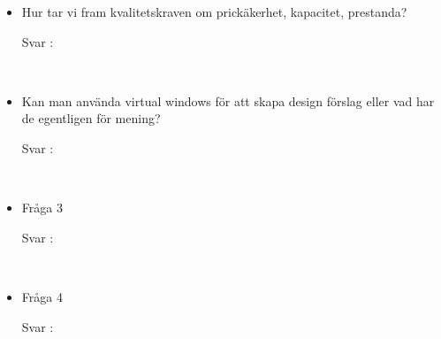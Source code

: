 \documentclass{article}
\begin{document}
\begin{itemize}
    \item Hur tar vi fram kvalitetskraven om prickäkerhet, kapacitet, prestanda?
        \begin{description}
            \item[Svar :]
        \end{description}
    \\
     \item Kan man använda virtual windows för att skapa design förslag eller vad har de egentligen för mening?
        \begin{description}
            \item[Svar :]
        \end{description}
    \\
    \item Fråga 3
        \begin{description}
            \item[Svar :]
        \end{description}  
    \\
     \item Fråga 4
        \begin{description}
            \item[Svar :]
        \end{description}
    \\
\end{itemize}
\end{document}
